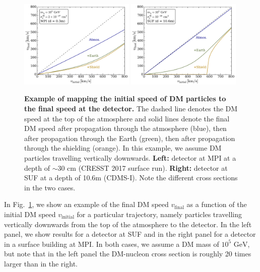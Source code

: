 \documentclass[prd,twocolumn,showpacs,nofootinbib,aps]{revtex4-1}
\newcommand{\Bradley}[1]{\textcolor{red}{\textbf{BJK:} #1}}
\begin{document}
\begin{figure}[t]
\centering
\includegraphics[width=0.49\textwidth,]{plots/VelocityTransfer_nucleus.pdf}
\includegraphics[width=0.49\textwidth,]{plots/VelocityTransfer_CDMS.pdf}
\caption{\textbf{Example of mapping the initial speed of DM particles to the final speed at the detector.} The dashed line denotes the DM speed at the top of the atmosphere and solid lines denote the final DM speed after propagation through the atmosphere (blue), then after propagation through the Earth (green), then after propagation through the shielding (orange). In this example, we assume DM particles travelling vertically downwards. \textbf{Left:} detector at MPI at a depth of $\sim 30$ cm (CRESST 2017 surface run). \textbf{Right:} detector at SUF  at a depth of 10.6m (CDMS-I). Note the different cross sections in the two cases.}
\label{fig:VelocityTransfer}
\end{figure}


In Fig.~\ref{fig:VelocityTransfer}, we show an example of the final DM speed $v_\mathrm{final}$ as a function of the initial DM speed $v_\mathrm{initial}$ for a particular trajectory, namely particles travelling vertically downwards from the top of the atmosphere to the detector. In the left panel, we show results for a detector at SUF and in the right panel for a detector in a surface building at MPI. In both cases, we assume a DM mass of $10^5\,\, \mathrm{GeV}$, but note that in the left panel the DM-nucleon cross section is roughly 20 times larger than in the right.
\end{document}
